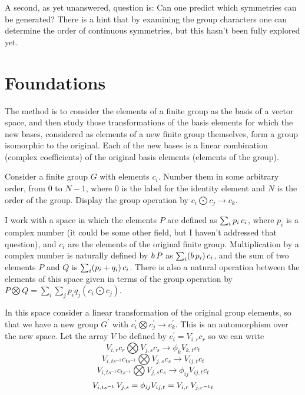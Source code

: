\documentclass[12pt]{article}
\begin{document}
 A second, as yet unanswered, question is:  Can one predict which
symmetries can be generated?  There is a hint that by examining the
group characters one can determine the order of continuous symmetries,
but this hasn't been fully explored yet.

\section{ Foundations}
 The method is to consider the elements of a finite group as the basis
of a vector space, and then study those transformations of the basis
elements for which the new bases, considered as elements of a new
finite group
themselves, form a group isomorphic to the original.  Each of the new
bases is a linear combination (complex coefficients) of the original
basis elements (elements of the group).  


 Consider a finite group $G$ with elements $c_i$.  Number them in some
arbitrary order, from $0$ to $N-1$, where $0$ is the label for the
identity element and $N$ is the order of the group.  Display the
group operation by 
$c_i \bigodot c_j \rightarrow c_k$.  

 I work with a space in which the elements $P$ are defined as
$\sum_i p_i \thinspace c_i$, where $p_i$ is a complex number (it could be some other
field, but I haven't addressed that question), and $c_i$ are the elements
of the original finite group.  Multiplication by a complex number is
naturally defined by $b \thinspace P $ as $\sum_i ( b \thinspace p_i )
\thinspace c_i$, and the sum of two elements $P$ and $Q$ is
$\sum_i ( p_i + q_i ) \thinspace c_i$.  There is also a natural operation between
the elements of this space given in terms of the group operation by
$P \bigotimes Q = \sum_i \sum_j p_i q_j (c_i \bigodot c_j )$.

 
 In this space consider a linear transformation of the
original group elements, 
so that we have a new group $G^\prime$ with
$c_i^\prime \bigotimes c_j^\prime \rightarrow c_k^\prime$.  
This is an automorphism over the new space.  Let the
array $V$ be defined by
$c_i^\prime = V_{i,r} c_r$ so we can write
\begin{equation}
V_{i,r} c_r \bigotimes V_{j,s} c_s \rightarrow \phi_{k} V_{k,t} c_t
\end{equation}
\begin{equation}
V_{i,ts^{-1}} c_{ts^{-1}} \bigotimes V_{j,s} c_s \rightarrow V_{ij,t} c_t
\end{equation}
\begin{equation}
V_{i,ts^{-1}} c_{ts^{-1}} \bigotimes V_{j,s} c_s \rightarrow \phi_{ij} V_{ij,t} c_t
\end{equation}
\begin{equation}
V_{i,ts^{-1}} \thinspace V_{j,s} = \phi_{ij} V_{ij,t} = V_{i,r} \thinspace V_{j,r^{-1}t}
\end{equation}
\end{document}
